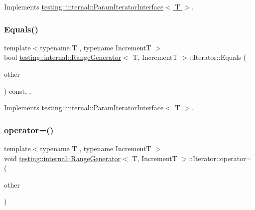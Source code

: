 Implements \hyperlink{classtesting_1_1internal_1_1ParamIteratorInterface_adfff808576d929085679c315b255af7e}{testing\+::internal\+::\+Param\+Iterator\+Interface$<$ T $>$}.

\mbox{\label{classtesting_1_1internal_1_1RangeGenerator_1_1Iterator_a534406abbddb137d7672c2b53d5bff0b}} 
\subsubsection{\texorpdfstring{Equals()}{Equals()}}
{\footnotesize\ttfamily template$<$typename T , typename IncrementT $>$ \\
bool \hyperlink{classtesting_1_1internal_1_1RangeGenerator}{testing\+::internal\+::\+Range\+Generator}$<$ T, IncrementT $>$\+::Iterator\+::\+Equals (\begin{DoxyParamCaption}\item[{const \hyperlink{classtesting_1_1internal_1_1ParamIteratorInterface}{Param\+Iterator\+Interface}$<$ T $>$ \&}]{other }\end{DoxyParamCaption}) const\hspace{0.3cm}{\ttfamily [inline]}, {\ttfamily [override]}, {\ttfamily [virtual]}}



Implements \hyperlink{classtesting_1_1internal_1_1ParamIteratorInterface_a9d811697a752d46f7bd6a0082f9040a3}{testing\+::internal\+::\+Param\+Iterator\+Interface$<$ T $>$}.

\mbox{\label{classtesting_1_1internal_1_1RangeGenerator_1_1Iterator_acd95aafca4a92db473dd4a88bbc9ab1b}} 
\subsubsection{\texorpdfstring{operator=()}{operator=()}}
{\footnotesize\ttfamily template$<$typename T , typename IncrementT $>$ \\
void \hyperlink{classtesting_1_1internal_1_1RangeGenerator}{testing\+::internal\+::\+Range\+Generator}$<$ T, IncrementT $>$\+::Iterator\+::operator= (\begin{DoxyParamCaption}\item[{const \hyperlink{classtesting_1_1internal_1_1RangeGenerator_1_1Iterator}{Iterator} \&}]{other }\end{DoxyParamCaption})\hspace{0.3cm}{\ttfamily [private]}}



